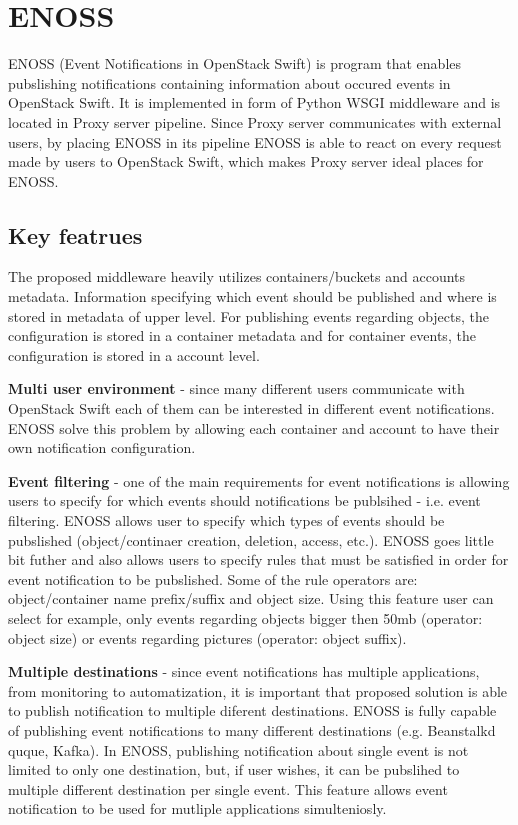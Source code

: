 \documentclass{ExcelAtFIT}
\begin{document}
\section{ENOSS}

ENOSS (Event Notifications in OpenStack Swift) is program that enables pubslishing notifications containing information about occured events in OpenStack Swift. It is implemented in form of Python WSGI middleware and is located in Proxy server pipeline. Since Proxy server communicates with external users, by placing ENOSS in its pipeline ENOSS is able to react on every request made by users to OpenStack Swift, which makes Proxy server ideal places for ENOSS.

\subsection{Key featrues}
The proposed middleware heavily utilizes containers/buckets and accounts metadata. Information specifying which event should be published and where is stored in metadata of upper level. For publishing events regarding objects, the configuration is stored in a container metadata and for container events, the configuration is stored in a account level.

\textbf{Multi user environment} - since many different users communicate with OpenStack Swift each of them can be interested in different event notifications. ENOSS solve this problem by allowing each container and account to have their own notification configuration.

\textbf{Event filtering} - one of the main requirements for event notifications is allowing users to specify for which events should notifications be publsihed - i.e. event filtering. ENOSS allows user to specify which types of events should be pubslished (object/continaer creation, deletion, access, etc.). ENOSS goes little bit futher and also allows users to specify rules that must be satisfied in order for event notification to be pubslished. Some of the rule operators are: object/container name prefix/suffix and object size. Using this feature user can select for example, only events regarding objects bigger then 50mb (operator: object size) or events regarding pictures (operator: object suffix).

\textbf{Multiple destinations} - since event notifications has multiple applications, from monitoring to automatization, it is important that proposed solution is able to publish notification to multiple diferent destinations. ENOSS is fully capable of publishing event notifications to many different destinations (e.g. Beanstalkd quque, Kafka). In ENOSS, publishing notification about single event is not limited to only one destination, but, if user wishes, it can be pubslihed to  multiple different destination per single event. This feature allows event notification to be used for mutliple applications simulteniosly.
\end{document}

